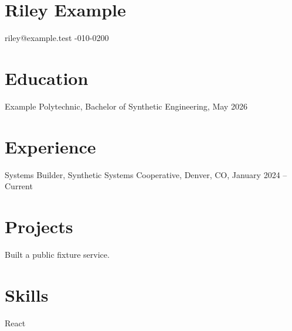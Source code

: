 \documentclass{article}
\begin{document}
\section*{Riley Example}
riley@example.test -010-0200
\section*{Education}
Example Polytechnic, Bachelor of Synthetic Engineering, May 2026
\section*{Experience}
Systems Builder, Synthetic Systems Cooperative, Denver, CO, January 2024 -- Current
\section*{Projects}
Built a public fixture service.
\section*{Skills}
React
\end{document}
